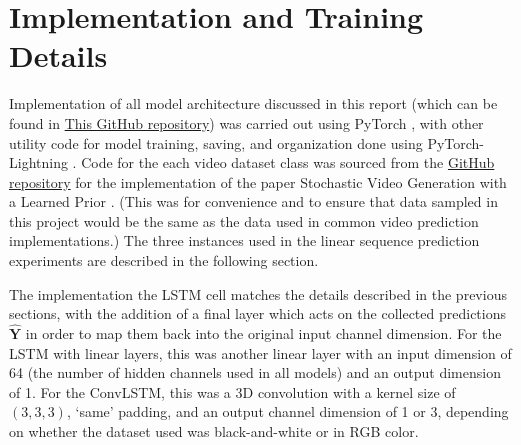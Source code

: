 \documentclass{scrartcl}
\begin{document}
%
%
%
%

\newpage 
\section{Implementation and Training Details}
\label{sec:details}

Implementation of all model architecture discussed in this report (which can be
found in \href{https://github.com/msc5/junior-iw}{This GitHub repository}) was
carried out using PyTorch \cite{pytorch}, with other utility code for model
training, saving, and organization done using PyTorch-Lightning
\cite{pytorch_lightning}. Code for the each video dataset 
class was sourced from the \href{https://github.com/edenton/svg}{GitHub
repository} for the implementation of the paper Stochastic Video Generation
with a Learned Prior \cite{svg_dataloaders}. (This was for convenience and to
ensure that data sampled in this project would be the same as the data used in
common video prediction implementations.) The three 
instances used in the linear sequence prediction experiments are described in
the following section.

The implementation the LSTM cell matches the details described in the previous
sections, with the addition of a final layer which acts on the collected
predictions $\hat{\boldsymbol{Y}}$ in order to map them back into the original
input channel dimension. For the LSTM with linear layers, this was another
linear layer with an input dimension of 64 (the number of hidden channels used
in all models) and an output dimension of 1. For the ConvLSTM, this was a 3D
convolution with a kernel size of $(3, 3, 3)$, `same' padding, and an output
channel dimension of 1 or 3, depending on whether the dataset used was
black-and-white or in RGB color.
\end{document}
